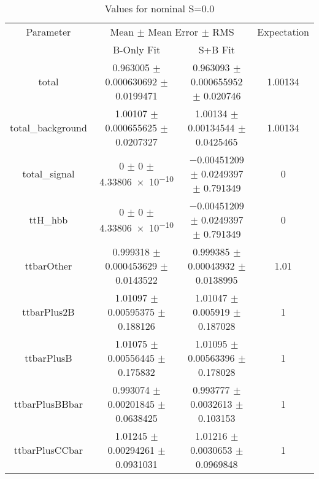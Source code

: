\begin{table}
\centering
\caption{Values for nominal S=0.0}
\begin{tabular}{cccc}
\toprule
Parameter & \multicolumn{2}{c}{Mean $\pm$ Mean Error $\pm$ RMS} & Expectation\\
 & B-Only Fit & S+B Fit & \\
\midrule
total & \num{0.963005} $\pm$ \num{0.000630692} $\pm$ \num{0.0199471} & \num{0.963093} $\pm$ \num{0.000655952} $\pm$ \num{0.020746} & \num{1.00134}\\
total\_background & \num{1.00107} $\pm$ \num{0.000655625} $\pm$ \num{0.0207327} & \num{1.00134} $\pm$ \num{0.00134544} $\pm$ \num{0.0425465} & \num{1.00134}\\
total\_signal & \num{0} $\pm$ \num{0} $\pm$ \num{4.33806e-10} & \num{-0.00451209} $\pm$ \num{0.0249397} $\pm$ \num{0.791349} & \num{0}\\
ttH\_hbb & \num{0} $\pm$ \num{0} $\pm$ \num{4.33806e-10} & \num{-0.00451209} $\pm$ \num{0.0249397} $\pm$ \num{0.791349} & \num{0}\\
ttbarOther & \num{0.999318} $\pm$ \num{0.000453629} $\pm$ \num{0.0143522} & \num{0.999385} $\pm$ \num{0.00043932} $\pm$ \num{0.0138995} & \num{1.01}\\
ttbarPlus2B & \num{1.01097} $\pm$ \num{0.00595375} $\pm$ \num{0.188126} & \num{1.01047} $\pm$ \num{0.005919} $\pm$ \num{0.187028} & \num{1}\\
ttbarPlusB & \num{1.01075} $\pm$ \num{0.00556445} $\pm$ \num{0.175832} & \num{1.01095} $\pm$ \num{0.00563396} $\pm$ \num{0.178028} & \num{1}\\
ttbarPlusBBbar & \num{0.993074} $\pm$ \num{0.00201845} $\pm$ \num{0.0638425} & \num{0.993777} $\pm$ \num{0.0032613} $\pm$ \num{0.103153} & \num{1}\\
ttbarPlusCCbar & \num{1.01245} $\pm$ \num{0.00294261} $\pm$ \num{0.0931031} & \num{1.01216} $\pm$ \num{0.0030653} $\pm$ \num{0.0969848} & \num{1}\\
\bottomrule
\end{tabular}
\end{table}